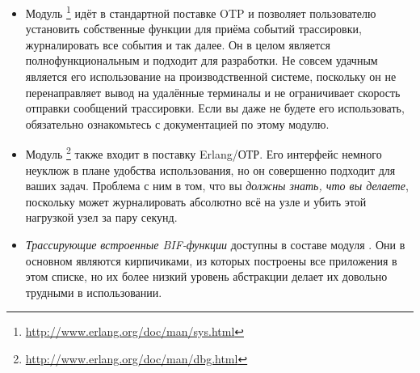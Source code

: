\begin{itemize}
	\item Модуль \footnote{\href{http://www.erlang.org/doc/man/sys.html}{http://www.erlang.org/doc/man/sys.html}} идёт в стандартной поставке OTP и позволяет пользователю установить собственные функции для приёма событий трассировки, журналировать все события и так далее. Он в целом является полнофункциональным и подходит для разработки. Не совсем удачным является его использование на производственной системе, поскольку он не перенаправляет вывод на удалённые терминалы и не ограничивает скорость отправки сообщений трассировки. Если вы даже не будете его использовать, обязательно ознакомьтесь с документацией по этому модулю.
	
	\item Модуль \footnote{\href{http://www.erlang.org/doc/man/dbg.html}{http://www.erlang.org/doc/man/dbg.html}} также входит в поставку Erlang/ОТР. Его интерфейс немного неуклюж в плане удобства использования, но он совершенно подходит для ваших задач. Проблема с ним в том, что вы \emph{должны знать, что вы делаете}, поскольку  может журналировать абсолютно всё на узле и убить этой нагрузкой узел за пару секунд.
	
	\item \emph{Трассирующие встроенные BIF-функции} доступны в составе модуля . Они в основном являются кирпичиками, из которых построены все приложения в этом списке, но их более низкий уровень абстракции делает их довольно трудными в использовании.
	

\end{itemize}
